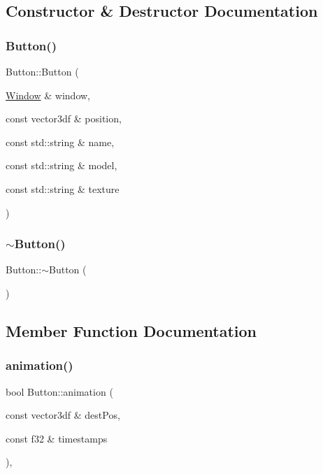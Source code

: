 \subsection{Constructor \& Destructor Documentation}
\mbox{\label{class_button_aa43954b8d3bd4036c2f5145e78aef78d}} 
\subsubsection{\texorpdfstring{Button()}{Button()}}
{\footnotesize\ttfamily Button\+::\+Button (\begin{DoxyParamCaption}\item[{\mbox{\hyperlink{class_window}{Window}} \&}]{window,  }\item[{const vector3df \&}]{position,  }\item[{const std\+::string \&}]{name,  }\item[{const std\+::string \&}]{model,  }\item[{const std\+::string \&}]{texture }\end{DoxyParamCaption})}

\mbox{\label{class_button_a2a001eb9c3cc8ae54768a850dd345002}} 
\subsubsection{\texorpdfstring{$\sim$Button()}{~Button()}}
{\footnotesize\ttfamily Button\+::$\sim$\+Button (\begin{DoxyParamCaption}{ }\end{DoxyParamCaption})}



\subsection{Member Function Documentation}
\mbox{\label{class_button_a0bd4601e48eb6ef67ee192561fa4cfd0}} 
\subsubsection{\texorpdfstring{animation()}{animation()}}
{\footnotesize\ttfamily bool Button\+::animation (\begin{DoxyParamCaption}\item[{const vector3df \&}]{dest\+Pos,  }\item[{const f32 \&}]{timestamps }\end{DoxyParamCaption})\hspace{0.3cm}{\ttfamily [override]}, {\ttfamily [virtual]}}



